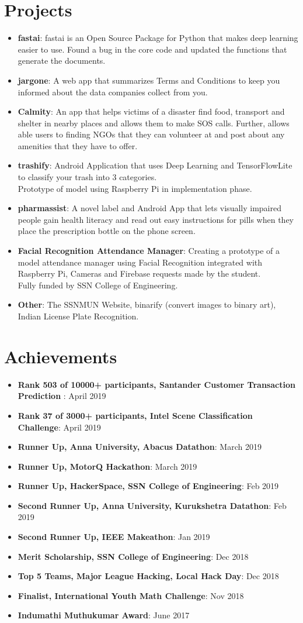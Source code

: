 \documentclass[letterpaper,11pt]{article}
\newcommand{\resumeItem}[2]{
  \item\small{
    \textbf{#1}{: #2 \vspace{-2pt}}
  }
}
\newcommand{\resumeSubItem}[2]{\resumeItem{#1}{#2}\vspace{-4pt}}
\newcommand{\resumeSubHeadingListStart}{\begin{itemize}[leftmargin=*]}
\newcommand{\resumeSubHeadingListEnd}{\end{itemize}}
\begin{document}
\section{Projects}
  \resumeSubHeadingListStart
  \resumeSubItem{fastai}
      {fastai is an Open Source Package for Python that makes deep learning easier to use. Found a bug in the core code and updated the functions that generate the documents.}
  \resumeSubItem{jargone}
      {A web app that summarizes Terms and Conditions to keep you informed about the data companies collect from you. }
    \resumeSubItem{Calmity}
      {An app that helps victims of a disaster find food, transport and shelter in nearby places and allows them to make SOS calls. Further, allows able users to finding NGOs that they can volunteer at and post about any amenities that they have to offer.}
      \resumeSubItem{trashify}
      {Android Application that uses Deep Learning and TensorFlowLite to classify your trash into 3 categories.\\Prototype of model using Raspberry Pi in implementation phase.}
	\resumeSubItem{pharmassist}
      {A novel label and Android App that lets visually impaired people gain health literacy and read out easy  instructions for pills when they place the prescription bottle on the phone screen. }
    \resumeSubItem{Facial Recognition Attendance Manager}
      {Creating a prototype of a model attendance manager using Facial Recognition integrated with Raspberry Pi, Cameras and Firebase requests made by the student. \\Fully funded by SSN College of Engineering.}
      \resumeSubItem{Other}
      {The SSNMUN Website, binarify (convert images to binary art), Indian License Plate Recognition.}
  \resumeSubHeadingListEnd

%
\section{Achievements}
  \resumeSubHeadingListStart
  \resumeSubItem
  {Rank 503 of 10000+ participants, Santander Customer Transaction Prediction }{April 2019}
           \resumeSubItem
  {Rank 37 of 3000+ participants, Intel Scene Classification Challenge}{April 2019}
      \resumeSubItem
  {Runner Up, Anna University, Abacus Datathon}{March 2019}
         \resumeSubItem
  {Runner Up, MotorQ Hackathon}{March 2019}
      \resumeSubItem
  {Runner Up, HackerSpace, SSN College of Engineering}{Feb 2019}
    \resumeSubItem
  {Second Runner Up, Anna University, Kurukshetra Datathon}{Feb 2019}
  \resumeSubItem
  {Second Runner Up, IEEE Makeathon}{Jan 2019} 	
  \resumeSubItem
  {Merit Scholarship, SSN College of Engineering}{Dec 2018}
     \resumeSubItem
      {Top 5 Teams, Major League Hacking, Local Hack Day}{Dec 2018}
  \resumeSubItem
    {Finalist, International Youth Math Challenge}{Nov 2018}
    \resumeSubItem
      {Indumathi Muthukumar Award}{June 2017}
  \resumeSubHeadingListEnd
\end{document}
